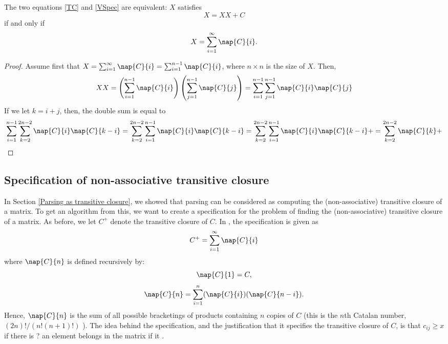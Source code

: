  \begin{Proposition}
   The two equations \eqref{TC} and \eqref{VSpec} are equivalent: $X$ satisfies 
   \begin{equation}
     X = XX + C
   \end{equation}
   if and only if 
   \begin{equation}
     X = \sum_{i = 1}^\infty \nap{C}{i}.
   \end{equation}
 \end{Proposition}
 \begin{proof}
   Assume first that $X = \sum_{i = 1}^\infty \nap{C}{i}= \sum_{i = 1}^{n-1}\nap{C}{i}$, where $n \times n$ is the size of $X$. Then, 
   \begin{equation*}
     X X = 
     \left(\sum_{i = 1}^{n-1}\nap{C}{i}\right)\left(\sum_{j = 1}^{n-1}\nap{C}{j}\right) =
     \sum_{i = 1}^{n - 1}\sum_{j = 1}^{n-1}\nap{C}{i}\nap{C}{j}
   \end{equation*}
   If we let $k = i + j$, then, the double sum is equal to 
   \begin{equation*}
     \sum_{i = 1}^{n - 1}\sum_{k = 2}^{2n-2}\nap{C}{i}\nap{C}{k - i} = 
     \sum_{k = 2}^{2n-2}\sum_{i = 1}^{n - 1}\nap{C}{i}\nap{C}{k - i} = 
     \sum_{k = 2}^{2n-2}\sum_{i = 1}^{n - 1}\nap{C}{i}\nap{C}{k - i} + = 
\sum_{k = 2}^{2n-2}\nap{C}{k} + 
   \end{equation*}

 \end{proof}


\subsection{Specification of non-associative transitive closure}
In Section \ref{Parsing as transitive closure}, we showed that parsing can be considered as computing the (non-associative) transitive closure of a matrix. To get an algorithm from this, we want to create a specification for the problem of finding the (non-associative) transitive closure of a matrix. As before, we let $C^+$ denote the transitive closure of $C$. In \cite{Valiant}, the specification is given as
\begin{equation}
  \label{VSpec}
  C^+ = \sum_{i = 1}^{\infty}\nap{C}{i}
\end{equation}
where $\nap{C}{n}$ is defined recursively by:
\begin{equation}
  \nap{C}{1} = C,
\end{equation}
\begin{equation}
  \label{VSpec-rec}
  \nap{C}{n} = \sum_{i = 1}^n(\nap{C}{i})(\nap{C}{n-i}).
\end{equation}
Hence, $\nap{C}{n}$ is the sum of all possible bracketings of products containing $n$ copies of $C$ (this is the $n$th Catalan number, $(2n)!/(n!(n+1)!)$ \cite{mathworld-catalan}).
The idea behind the specification, and the justification that it specifies the transitive closure of $C$, is that $c_{ij} \ge x$ if there is ? an element belongs in the matrix if it .

